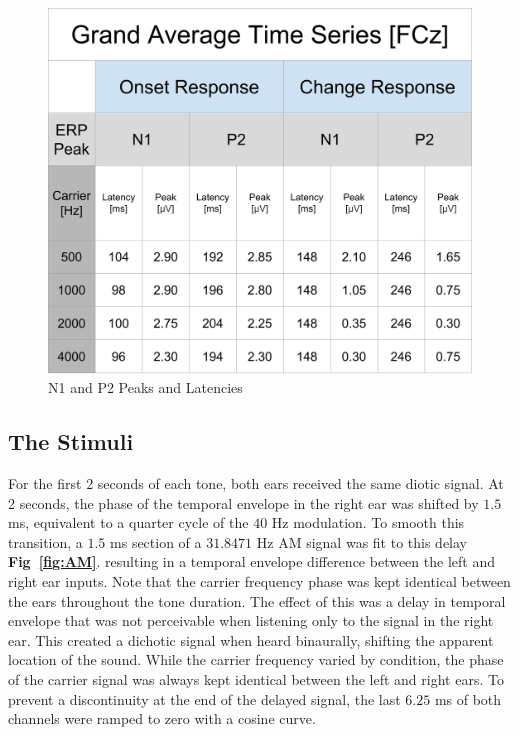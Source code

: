\documentclass[12pt,journal,compsoc,twocolumn]{IEEEtran}
\begin{document}
\begin{figure}[b]
\centering
\includegraphics[width=3.0 in]{erp_chart.png}
\caption{N1 and P2 Peaks and Latencies}
\label{fig:erp_chart}
\end{figure}

\subsection{The Stimuli}
For the first 2 seconds of each tone, both ears received the same diotic signal. At 2 seconds, the phase of the temporal envelope in the right ear was shifted by $1.5$ ms, equivalent to a quarter cycle of the $40$ Hz modulation. To smooth this transition, a $1.5$ ms section of a $31.8471$ Hz AM signal was fit to this delay \textbf{Fig~\ref{fig:AM}}. resulting in a temporal envelope difference between the left and right ear inputs. Note that the carrier frequency phase was kept identical between the ears throughout the tone duration. The effect of this was a delay in temporal envelope that was not perceivable when listening only to the signal in the right ear. This created a dichotic signal when heard binaurally, shifting the apparent location of the sound. While the carrier frequency varied by condition, the phase of the carrier signal was always kept identical between the left and right ears. To prevent a discontinuity at the end of the delayed signal, the last $6.25$ ms of both channels were ramped to zero with a cosine curve.

\end{document}
